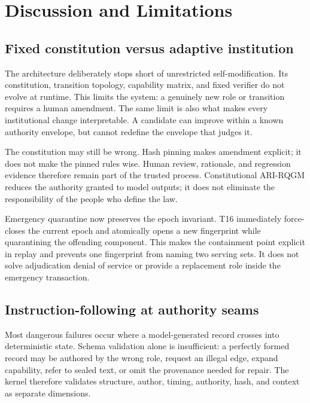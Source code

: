 \section{Discussion and Limitations}\label{sec:discussion}

\subsection{Fixed constitution versus adaptive institution}\label{sec:discussion:p2}

The architecture deliberately stops short of unrestricted
self-modification. Its constitution, transition topology, capability
matrix, and fixed verifier do not evolve at runtime. This limits the
system: a genuinely new role or transition requires a human amendment.
The same limit is also what makes every institutional change
interpretable. A candidate can improve within a known authority envelope,
but cannot redefine the envelope that judges it.

The constitution may still be wrong. Hash pinning makes amendment
explicit; it does not make the pinned rules wise. Human review, rationale,
and regression evidence therefore remain part of the trusted process.
Constitutional ARI-RQGM reduces the authority granted to model outputs; it
does not eliminate the responsibility of the people who define the law.

Emergency quarantine now preserves the epoch invariant. T16 immediately
force-closes the current epoch and atomically opens a new fingerprint while
quarantining the offending component. This makes the containment point
explicit in replay and prevents one fingerprint from naming two serving
sets. It does not solve adjudication denial of service or provide a
replacement role inside the emergency transaction.

\subsection{Instruction-following at authority seams}\label{sec:discussion:seams}

Most dangerous failures occur where a model-generated record crosses into
deterministic state. Schema validation alone is insufficient: a perfectly
formed record may be authored by the wrong role, request an illegal edge,
expand capability, refer to sealed text, or omit the provenance needed for
repair. The kernel therefore validates structure, author, timing,
authority, hash, and context as separate dimensions.

